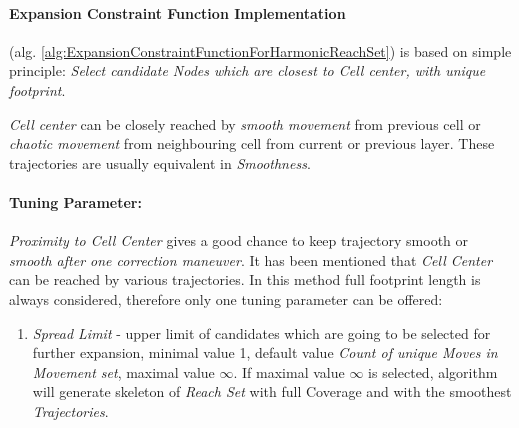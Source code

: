 \paragraph{Expansion Constraint Function Implementation} (alg. \ref{alg:ExpansionConstraintFunctionForHarmonicReachSet}) is based on simple principle: \emph{Select candidate Nodes  which are closest to Cell center, with unique footprint}.

\begin{note}
    \emph{Cell center} can be closely reached by \emph{smooth movement} from previous cell or \emph{chaotic movement} from neighbouring cell from current or previous layer. These trajectories are usually equivalent in \emph{Smoothness}.
\end{note}

\paragraph{Tuning Parameter:} \emph{Proximity to Cell Center} gives a good chance to keep trajectory smooth or \emph{smooth after one correction maneuver}. It has been mentioned that \emph{Cell Center} can be reached by various trajectories. In this method full footprint length is always considered, therefore only one tuning parameter can be offered:
\begin{enumerate}
    \item \emph{Spread Limit} - upper limit of candidates which are going to be selected for further expansion, minimal value 1, default value \emph{Count of unique Moves in Movement set}, maximal value $\infty$. If maximal value $\infty$ is selected, algorithm will generate skeleton of \emph{Reach Set} with full Coverage and with the smoothest \emph{Trajectories}.
\end{enumerate}

